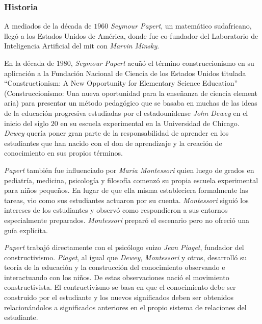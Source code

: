 \subsubsection{Historia}

A mediados de la década de $1960$ \textit{Seymour Papert}, un matemático
sudafricano, llegó a los Estados Unidos de América, donde fue co-fundador del
Laboratorio de Inteligencia Artificial del \Gls{mit} con \textit{Marvin
    Minsky}\cite{logo:sg}. 


En la década de $1980$, \textit{Seymour Papert} acuñó el término
construccionismo en su aplicación a la Fundación Nacional de Ciencia de los
Estados Unidos titulada \enquote{Constructionism: A New Opportunity for
    Elementary Science Education} (Construccionismo:
Una nueva oportunidad para la enseñanza de ciencia element aria) para presentar
un método pedagógico que se basaba en muchas de las ideas de la educación
progresiva estudiadas por el estadounidense \textit{John Dewey} en el inicio del
siglo $20$ en su escuela experimental en la Universidad de Chicago.
\textit{Dewey} quería poner gran parte de la responsabilidad de aprender en los
estudiantes que han nacido con el don de aprendizaje y la creación de
conocimiento en sus propios términos\cite{historia:2014}.


\textit{Papert} también fue influenciado por \textit{Maria Montessori} quien
luego de grados en pediatría, medicina, psicología y filosofía comenzó su propia
escuela experimental para niños pequeños. En lugar de que ella misma
estableciera formalmente las tareas, vio como sus estudiantes actuaron por su
cuenta. \textit{Montessori} siguió los intereses de los estudiantes y observó como
respondieron a sus entornos especialmente preparados. \textit{Montessori}
preparó el escenario pero no ofreció una guía explícita\cite{historia:2014}.

\textit{Papert} trabajó directamente con el psicólogo suizo \textit{Jean
    Piaget}, fundador del constructivismo. \textit{Piaget}, al igual que
\textit{Dewey}, \textit{Montessori} y otros, desarrolló su teoría de la
educación y la construcción del conocimiento observando e interactuando con los
niños. De estas observaciones nació el movimiento constructivista. El
contructivismo se basa en que el conocimiento debe ser construido por el
estudiante y los nuevos significados deben ser obtenidos relacionándolos a
significados anteriores en el propio sistema de relaciones del
estudiante\cite{historia:2014}. 

